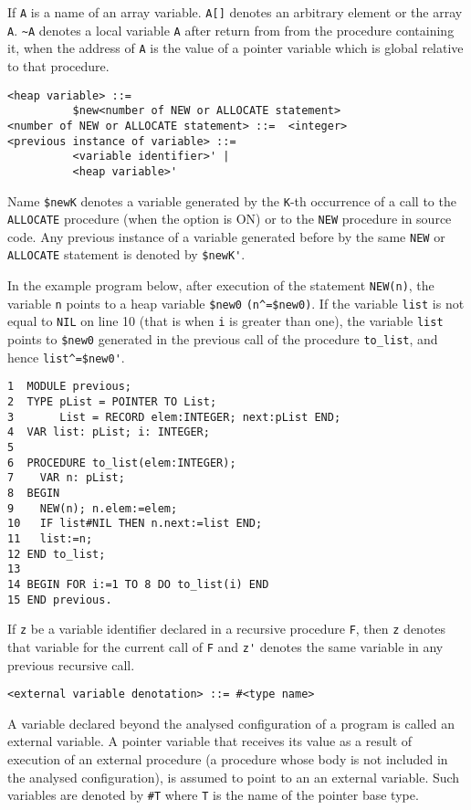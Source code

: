 If \verb'A' is a name of an array variable. \verb'A[]' denotes an arbitrary
element or the array \verb'A'. \verb'~A' denotes a local variable \verb'A'
after return from from the procedure containing it, when the address of
\verb'A' is the value of a pointer variable which is global
relative to that procedure. 

\begin{verbatim}
<heap variable> ::= 
          $new<number of NEW or ALLOCATE statement>
<number of NEW or ALLOCATE statement> ::=  <integer> 
<previous instance of variable> ::= 
          <variable identifier>' |
          <heap variable>' 
\end{verbatim}

Name \verb'$newK' denotes a variable generated by the \verb'K'-th occurrence of
a call to the \verb'ALLOCATE' procedure (when the option  
is ON) or to the \verb'NEW' procedure in source code. 
Any previous instance of a variable generated before by the same 
\verb'NEW' or \verb'ALLOCATE' statement is denoted by \verb"$newK'". 

In the example program below, after execution of the statement
\verb'NEW(n)', the variable \verb'n' points to a heap variable \verb'$new0' 
\verb'(n^=$new0)'. If the variable \verb'list' is not equal to \verb'NIL'
on line 10 (that is when \verb'i' is greater than one), the variable 
\verb'list' points to \verb'$new0' generated in the previous call of
the procedure \verb'to_list', and hence \verb"list^=$new0'". 

\begin{verbatim}
1  MODULE previous;
2  TYPE pList = POINTER TO List;
3       List = RECORD elem:INTEGER; next:pList END;
4  VAR list: pList; i: INTEGER;
5
6  PROCEDURE to_list(elem:INTEGER);
7    VAR n: pList;
8  BEGIN
9    NEW(n); n.elem:=elem;
10   IF list#NIL THEN n.next:=list END;
11   list:=n;
12 END to_list;
13
14 BEGIN FOR i:=1 TO 8 DO to_list(i) END
15 END previous.
\end{verbatim}

If \verb'z' be a variable identifier declared in a recursive procedure
\verb'F', then \verb'z' denotes that variable for the current call
of \verb'F' and \verb"z'" denotes the same variable in any previous 
recursive call.

\begin{verbatim}
<external variable denotation> ::= #<type name>
\end{verbatim}

A variable declared beyond the analysed configuration of a program
is called an external variable. A pointer variable that receives its value as
a result of execution of an external procedure (a procedure whose body is 
not included in the analysed configuration), is assumed to point to an
an external variable. Such variables are denoted by \verb'#T'
where \verb'T' is the name of the pointer base type.

